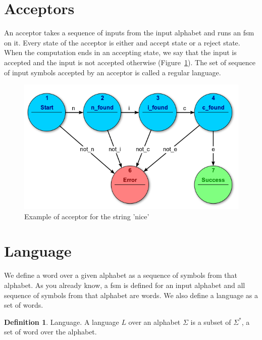 \documentclass[12pt]{article}
\theoremstyle{definition}
\newtheorem{definition}{Definition}[section]
\theoremstyle{definition}
\theoremstyle{remark}
\begin{document}
\section{Acceptors}


An acceptor takes a sequence of inputs from the input alphabet and runs an \gls{fsm} on it. Every state of the acceptor is either and accept state or a reject state. When the computation ends in an accepting state, we say that the input is accepted and the input is not accepted otherwise (Figure~\ref{acceptor}). The set of sequence of input symbols accepted by an acceptor is called a regular language.

\begin{figure}
    \centering
    \includegraphics[scale=0.8]{acceptor.png}
    \caption{Example of acceptor for the string 'nice'~\cite{FSM:2017}}
    \label{acceptor}
\end{figure}



\section{Language}


We define a word over a given alphabet as a sequence of symbols from that alphabet. As you already know, a \gls{fsm} is defined for an input alphabet and all sequence of symbols from that alphabet are words. We also define a language as a set of words.

\theoremstyle{definition}
\begin{definition}{Language.} A language $L$ over an alphabet $\Sigma$ is a subset of $\Sigma^*$, a set of word over the alphabet.
\end{definition}
\end{document}
